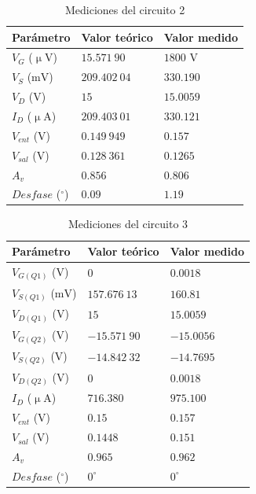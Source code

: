 \documentclass[journal]{IEEEtran}
\begin{document}
    
\begin{table}[H]
        \renewcommand{\arraystretch}{1.5}
        \caption{Mediciones del circuito 2}
        \centering
        \begin{tabular}{ >{\centering\arraybackslash}m{2.5cm} >{\centering\arraybackslash}m{2.5cm} >{\centering\arraybackslash}m{2.5cm} }
                \hline
            Parámetro & Valor teórico & Valor medido\\ 
            \hline
            $V_G$ ($\upmu\mathrm{V}$) & $15.571~90$  & $1800$ $\mathrm{V}$ \\
            $V_S$ ($\mathrm{mV}$) & $209.402~04$  & $330.190$  \\
            $V_D$ ($\mathrm{V}$) & $15$  & $15.0059$ \\
            $I_D$ ($\upmu\mathrm{A}$) & $209.403~01$  & $330.121$  \\
            $V_{ent}$ ($\mathrm{V}$) & $0.149~949$  & $0.157$  \\ 
            $V_{sal}$ ($\mathrm{V}$) & $0.128~361$  & $0.1265$  \\
            $A_v$ & $0.856$ & $0.806$ \\
            $Desfase$ ($^\circ$) & $0.09$  & $1.19$ \\
            \hline
        \end{tabular}
        \label{tabla7}
    \end{table}

\begin{table}[H]
        \renewcommand{\arraystretch}{1.5}
        \caption{Mediciones del circuito 3}
        \centering
        \begin{tabular}{ >{\centering\arraybackslash}m{2.5cm} >{\centering\arraybackslash}m{2.5cm} >{\centering\arraybackslash}m{2.5cm} }
                \hline
            Parámetro & Valor teórico & Valor medido\\ 
            \hline
            $V_{G(Q1)}$ ($\mathrm{V}$) & $0$  & $0.0018$  \\ 
            $V_{S(Q1)}$ ($\mathrm{mV}$) & $157.676~13$  & $160.81$  \\
            $V_{D(Q1)}$ ($\mathrm{V}$) & $15$  & $15.0059$  \\
            $V_{G(Q2)}$ ($\mathrm{V}$) & $-15.571~90$  & $-15.0056$  \\ 
            $V_{S(Q2)}$ ($\mathrm{V}$) & $-14.842~32$  & $-14.7695$  \\ 
            $V_{D(Q2)}$ ($\mathrm{V}$)& $0$  & $0.0018$  \\ 
            $I_D$ ($\upmu\mathrm{A}$) & $716.380$  & $975.100$  \\
            $V_{ent}$ ($\mathrm{V}$) & $0.15$  & $0.157$  \\ 
            $V_{sal}$ ($\mathrm{V}$) & $0.1448$  & $0.151$  \\
            $A_v$ & $0.965$ & $0.962$ \\
            $Desfase$ ($^\circ$) & $0^{\circ}$  & $0^{\circ}$ \\
            \hline
        \end{tabular}
        \label{tabla8}
    \end{table}
\end{document}
